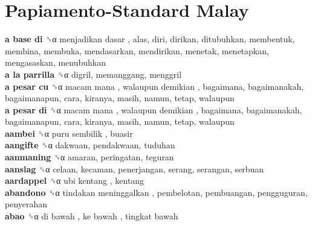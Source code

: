 \twocolumn
\chapter{Papiamento-Standard Malay}
\small
\raggedright
{}\textbf{a base di} ␝α   menjadikan dasar , alas, diri, dirikan, ditubuhkan, membentuk, membina, membuka, mendasarkan, mendirikan, menetak, menetapkan, mengasaskan, menubuhkan  \\
\textbf{a la parrilla} ␝α  digril, memanggang, menggril  \\
\textbf{a pesar cu} ␝α   macam mana ,  walaupun demikian , bagaimana, bagaimanakah, bagaimanapun, cara, kiranya, masih, namun, tetap, walaupun  \\
\textbf{a pesar di} ␝α   macam mana ,  walaupun demikian , bagaimana, bagaimanakah, bagaimanapun, cara, kiranya, masih, namun, tetap, walaupun  \\
\textbf{aambei} ␝α   puru sembilik , buasir  \\
\textbf{aangifte} ␝α  dakwaan, pendakwaan, tuduhan  \\
\textbf{aanmaning} ␝α  amaran, peringatan, teguran  \\
\textbf{aanslag} ␝α  celaan, kecaman, penerjangan, serang, serangan, serbuan  \\
\textbf{aardappel} ␝α   ubi kentang , kentang  \\
\textbf{abandono} ␝α   tindakan meninggalkan , pembelotan, pembuangan, pengguguran, penyerahan  \\
\textbf{abao} ␝α   di bawah ,  ke bawah ,  tingkat bawah   \\
